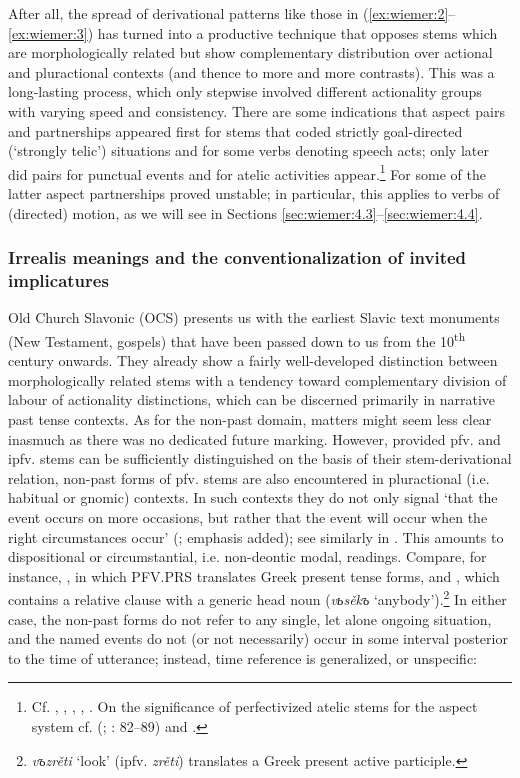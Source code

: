 \documentclass[output=paper,colorlinks,citecolor=brown]{langscibook}
\begin{document}
After all, the spread of derivational patterns like those in (\ref{ex:wiemer:2}--\ref{ex:wiemer:3}) has turned into a productive technique that opposes stems which are morphologically related but show complementary distribution over actional and pluractional contexts (and thence to more and more contrasts). This was a long-lasting process, which only stepwise involved different actionality groups with varying speed and consistency. There are some indications that aspect pairs and partnerships appeared first for stems that coded strictly goal-directed (‘strongly telic’) situations and for some verbs denoting speech acts; only later did pairs for punctual events and for atelic activities appear.\footnote{Cf. \citet{Bermel1997}, \citet[]{mende_1999}, \citet[]{EckhoffJanda2014}, \citet[]{eckhoff_2020}, \citet{Kamphuis2020}. On the significance of perfectivized atelic stems for the aspect system cf. \citeauthor{Arkadiev2014} (\citeyear{Arkadiev2014}; \citeyear{Arkadiev2015}: 82--89) and \citet[265--269]{wiemer_serzant_2017}.} For some of the latter aspect partnerships proved unstable; in particular, this applies to verbs of (directed) motion, as we will see in Sections \ref{sec:wiemer:4.3}--\ref{sec:wiemer:4.4}.


\subsubsection{Irrealis meanings and the conventionalization of invited implicatures}\label{sec:wiemer:3.1.2}

Old Church Slavonic (OCS) presents us with the earliest Slavic text monuments (New Testament, gospels) that have been passed down to us from the 10\textsuperscript{th} century onwards. They already show a fairly well-developed distinction between morphologically related stems with a tendency toward complementary division of labour of actionality distinctions, which can be discerned primarily in narrative past tense contexts. As for the non-past domain, matters might seem less clear inasmuch as there was no dedicated future marking. However, provided pfv. and ipfv. stems can be sufficiently distinguished on the basis of their stem\hyp{}derivational relation, non-past forms of pfv. stems are also encountered in pluractional (i.e. habitual or gnomic) contexts. In such contexts they do not only signal ‘that the event occurs on more occasions, but rather that the event will occur when the right circumstances occur’ (\cite[162]{Kamphuis2020}; emphasis added); see similarly in \citet[152]{Večerka1993}. This amounts to dispositional or circumstantial, i.e. non-deontic modal, readings. Compare, for instance, , in which PFV.PRS translates Greek present tense forms, and , which contains a relative clause with a generic head noun (\textit{vьsěkъ }‘anybody’).\footnote{\textit{vъzrěti} ‘look’ (ipfv. \textit{zrěti}) translates a Greek present active participle.} In either case, the non-past forms do not refer to any single, let alone ongoing situation, and the named events do not (or not necessarily) occur in some interval posterior to the time of utterance; instead, time reference is generalized, or unspecific:
\end{document}
